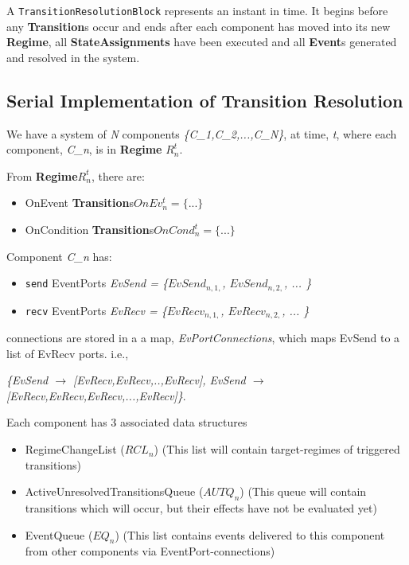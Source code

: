 \documentclass{article}
\newcommand{\EventPort}{{\bf{EventPort}}\xspace}
\newcommand{\Events}{{\bf{Event}}s\xspace}
\newcommand{\Regime}{{\bf{Regime}}\xspace}
\newcommand{\Transitions}{{\bf{Transition}}s\xspace}
\begin{document}
A {\tt TransitionResolutionBlock} represents an instant in time. It begins
before any \Transitions occur and ends after each component has moved
into its new \Regime, all \textbf{StateAssignments} have been executed
and all \Events generated and resolved in the system.

\subsection{Serial Implementation of Transition Resolution}

\newcommand{\CN}[0]{\textsl{C\_n}}

We have a system of \textsl{N} components \textsl{\{C\_1,C\_2,...,C\_N\}},
at time, \textsl{t}, where each component, \CN, is in \Regime
$R^{t}_{n}$.

\noindent From \Regime $R^{t}_{n}$, there are:
\begin{itemize}
\item OnEvent \Transitions $OnEv^{t}_{n} = \{ ... \}$
\item OnCondition \Transitions $OnCond^{t}_{n} = \{ ... \}$
\end{itemize}

\newcommand{\send}[0]{\texttt{send} }
\newcommand{\recv}[0]{\texttt{recv} }

\noindent Component \CN
has:
\begin{itemize}
\item \send EventPorts \textsl{EvSend = \{$EvSend_{n,1,}$, $EvSend_{n,2,}$, ... \}}
\item \recv EventPorts \textsl{EvRecv = \{$EvRecv_{n,1,}$, $EvRecv_{n,2,}$, ... \}}
\end{itemize}

\noindent \EventPort connections are stored in a a map,
\textsl{EvPortConnections}, which maps EvSend to a list of EvRecv ports. i.e.,

\textsl{\{EvSend $\rightarrow$ [EvRecv,EvRecv,..,EvRecv], EvSend $\rightarrow$
[EvRecv,EvRecv,EvRecv,...,EvRecv]\}}.

\newcommand{\RCLn}{$RCL_n$}
\newcommand{\AUTQn}{$AUTQ_n$}
\newcommand{\EQn}{$EQ_n$}

\noindent Each component has 3 associated data structures
\begin{itemize}
\item RegimeChangeList (\RCLn) (This list will contain target-regimes of
triggered transitions)
\item ActiveUnresolvedTransitionsQueue (\AUTQn) (This queue will
contain transitions which will occur, but their effects have not be
evaluated yet)
\item EventQueue (\EQn) (This list contains events delivered to this
component from other components via EventPort-connections)
\end{itemize}
\end{document}
